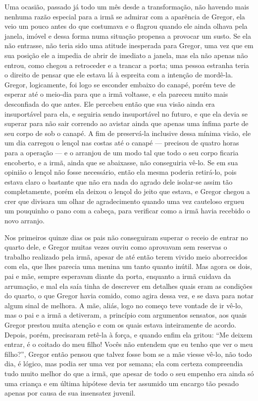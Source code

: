 Uma ocasião, passado já todo um mês desde a transformação, não havendo
mais nenhuma razão especial para a irmã se admirar com a aparência de
Gregor, ela veio um pouco antes do que costumava e o flagrou quando ele
ainda olhava pela janela, imóvel e dessa forma numa situação propensa a
provocar um susto. Se ela não entrasse, não teria sido uma atitude
inesperada para Gregor, uma vez que em sua posição ele a impedia de abrir
de imediato a janela, mas ela não apenas não entrou, como chegou a
retroceder e a trancar a porta; uma pessoa estranha teria o direito de
pensar que ele estava lá à espreita com a intenção de mordê-la. Gregor,
logicamente, foi logo se esconder embaixo do canapé, porém teve de esperar
até o meio-dia para que a irmã voltasse, e ela pareceu muito mais
desconfiada do que antes. Ele percebeu então que sua visão ainda era
insuportável para ela, e seguiria sendo insuportável no futuro, e que ela
devia se superar para não sair correndo ao avistar ainda que apenas uma ínfima parte
de seu corpo de sob o canapé. A fim de preservá-la inclusive
dessa mínima visão, ele um dia carregou o lençol nas costas até o canapé ---
precisou de quatro horas para a operação --- e o arranjou de um modo tal que
todo o seu corpo ficaria encoberto, e a irmã, ainda que se abaixasse, não
conseguiria vê-lo. Se em sua opinião o lençol não fosse necessário, então
ela mesma poderia retirá-lo, pois estava claro o bastante que não era nada
do agrado dele isolar-se assim tão completamente, porém ela deixou o
lençol do jeito que estava, e Gregor chegou a crer que divisara um olhar
de agradecimento quando uma vez cauteloso ergueu um pouquinho o pano com a
cabeça, para verificar como a irmã havia recebido o novo arranjo.

Nos primeiros quinze dias os pais não conseguiram superar o receio de
entrar no quarto dele, e Gregor muitas vezes ouviu como aprovavam sem
reservas o trabalho realizado pela irmã, apesar de até então terem vivido
meio aborrecidos com ela, que lhes parecia uma menina um tanto quanto
inútil. Mas agora os dois, pai e mãe, sempre esperavam diante da porta,
enquanto a irmã cuidava da arrumação, e mal ela saía tinha de descrever em
detalhes quais eram as condições do quarto, o que Gregor havia comido,
como agira dessa vez, e se dava para notar algum sinal de melhora. A mãe,
aliás, logo no começo teve vontade de ir vê-lo, mas o pai e a irmã a
detiveram, a princípio com argumentos sensatos, aos quais Gregor prestou
muita atenção e com os quais estava inteiramente de acordo. Depois, porém,
precisaram retê-la à força, e quando enfim ela gritou: “Me deixem entrar,
é o coitado do meu filho! Vocês não entendem que eu tenho que ver o meu
filho?”, Gregor então pensou que talvez fosse bom se a mãe viesse vê-lo,
não todo dia, é lógico, mas podia ser uma vez por semana; ela com certeza
compreendia tudo muito melhor do que a irmã, que apesar de todo o seu
empenho era ainda só uma criança e em última hipótese devia ter assumido
um encargo tão pesado apenas por causa de sua insensatez juvenil.

